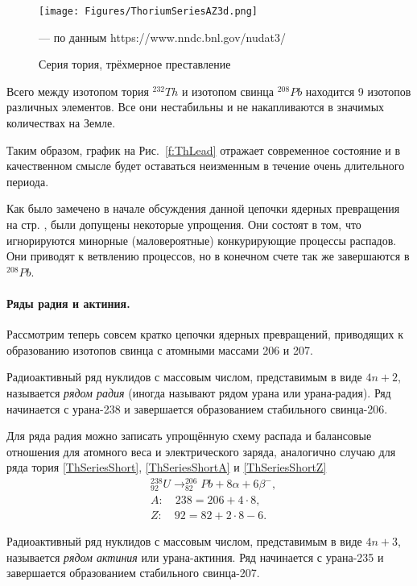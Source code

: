 \documentclass[a5paper,openany]{book}
\begin{document}
\begin{figure}[ht] 
	\centering\small
	\texttt{[image: Figures/ThoriumSeriesAZ3d.png]}
	\caption{Серия тория, трёхмерное преставление} 	--- по данным https://www.nndc.bnl.gov/nudat3/
	\label{f:ThLeadAZ3d}
\end{figure}
Всего между изотопом тория $^{232}Th$ и изотопом свинца $^{208}Pb$ находится 9 изотопов различных элементов. Все они нестабильны и не накапливаются в значимых количествах на Земле. 


Таким образом, график на Рис.~\ref{f:ThLead} отражает современное состояние и в качественном смысле будет оставаться неизменным в течение очень длительного периода.

Как было замечено в начале обсуждения данной цепочки ядерных превращения на стр. \pageref{ThSeries}, были допущены некоторые упрощения. Они состоят в том, что игнорируются минорные (маловероятные) конкурирующие процессы распадов. Они приводят к ветвлению процессов, но в конечном счете так же завершаются в $^{208}Pb$.

\paragraph{Ряды радия и актиния.} Рассмотрим теперь совсем кратко цепочки ядерных превращений, приводящих к образованию изотопов свинца с атомными массами 206 и 207.

Радиоактивный ряд нуклидов с массовым числом, представимым в виде $4n + 2$, называется \emph{рядом радия}  (иногда называют рядом урана или урана-радия). Ряд начинается с урана-238 и завершается образованием стабильного свинца-206.

Для ряда радия можно записать упрощённую схему распада и балансовые отношения для атомного веса и электрического заряда, аналогично случаю для ряда тория \eqref{ThSeriesShort}, \eqref{ThSeriesShortA} и \eqref{ThSeriesShortZ} 
\begin{align*} 
& _{92}^{238}U \longrightarrow  _{82}^{206}Pb + 8 \alpha +  6\beta^{-}, \\
& A: \quad 238 = 206 + 4 \cdot 8, \\
& Z: \quad 92 = 82 + 2 \cdot 8 - 6.
\end{align*}

Радиоактивный ряд нуклидов с массовым числом, представимым в виде $4n + 3$, называется \emph{рядом актиния}  или урана-актиния. Ряд начинается с урана-235 и завершается образованием стабильного свинца-207.
\end{document}
